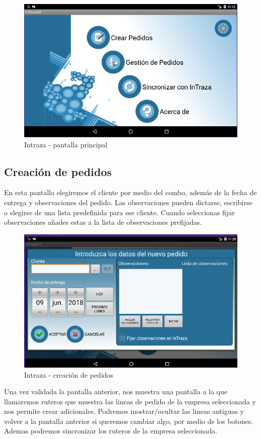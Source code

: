 \begin{figure}[H]
	\centering
	\includegraphics[width=0.65\linewidth]{figuras/manual/p1}
	\caption{Intraza - pantalla principal}
	\label{fig:Itzp1}
\end{figure}

\subsection{Creación de pedidos}

En esta pantalla elegiremos el cliente por medio del combo, además de la fecha de entrega y observaciones del pedido. Las observaciones pueden dictarse, escribirse o elegirse de una lista predefinida para ese cliente. Cuando seleccionas fijar observaciones añades estas a la lista de observaciones prefijadas. 

\begin{figure}[H]
	\centering
	\includegraphics[width=0.65\linewidth]{figuras/manual/p3}
	\caption{Intraza - creación de pedidos}
	\label{fig:Itzp2}
\end{figure}

Una vez validada la pantalla anterior, nos muestra una pantalla a la que llamaremos ruteros que muestra las lineas de pedido de la empresa seleccionada y nos permite crear adicionales. Podremos mostrar/ocultar las lineas antiguas y volver a la pantalla anterior si queremos cambiar algo, por medio de los botones. Ademas podremos sincronizar los ruteros de la empresa seleccionada.

